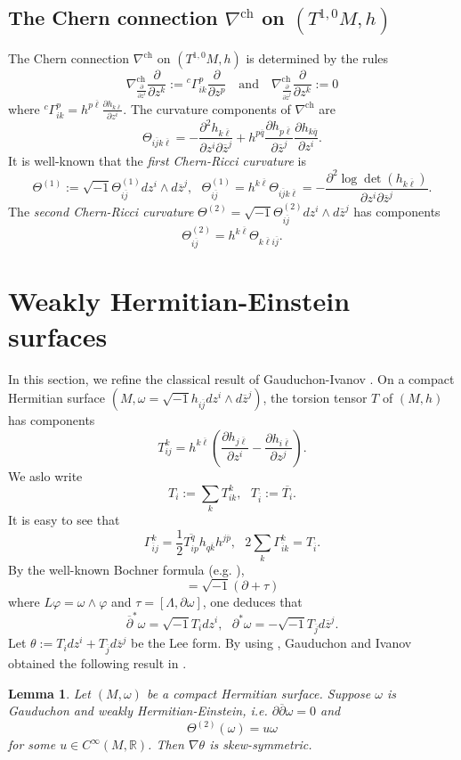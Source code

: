 \documentclass[12pt]{amsart}
\newcommand\bp{{\bar\partial}}
\theoremstyle{plain}
\newtheorem{lemma}[thm]{Lemma}
\theoremstyle{definition}
\newcommand{\elemma}{\end{lemma}}
\newcommand{\blemma}{\begin{lemma}}
\newcommand{\sq}{\sqrt{-1}}
\newcommand{\p}{\partial}
\renewcommand{\bar}{\overline}
\renewcommand{\phi}{\varphi}
\newcommand{\beq}{\begin{equation}}
\newcommand{\eeq}{\end{equation}}
\newcommand{\qtq}[1]{\quad\mbox{#1}\quad}
\renewcommand{\bp}{\bar{\partial}}
\renewcommand{\>}{\rightarrow}
\newcommand{\R}{{\mathbb R}}
\numberwithin{equation}{section} %
\begin{document}
	\baselineskip 	
	
	\subsection{The Chern connection $\nabla^{\mathrm{ch}}$ on $(T^{1,0}M,h)$} 
	\noindent 	The Chern
	connection $\nabla^{\mathrm{ch}}$ on $(T^{1,0}M,h)$ is  determined by the rules
	\beq
	\nabla^{\mathrm{ch}}_{\frac{\p}{\p z^i}}\frac{\p}{\p
		z^k}:={^c\Gamma}_{ik}^p\frac{\p}{\p z^p} \qtq{and}
	\nabla^{\mathrm{ch}}_{\frac{\p}{\p \bar z^j}}\frac{\p}{\p
		z^k}:=0 \eeq
	where ${^c\Gamma}_{ik}^p=h^{p\bar\ell}\frac{\p h_{k\bar\ell}}{\p z^i}$. 
	The curvature  components of $\nabla^{\mathrm{ch}}$ are \beq \Theta_{i\bar j k\bar
		\ell}=-\frac{\p^2 h_{k\bar \ell}}{\p z^i\p \bar z^j}+h^{p\bar
		q}\frac{\p h_{p\bar \ell}}{\p \bar z^j}\frac{\p h_{k\bar q}}{\p
		z^i}.\label{cherncurvatureformula} \eeq
	It is
	well-known that the \emph{first Chern-Ricci curvature} is \beq
	\Theta^{(1)}:= \sq\Theta^{(1)}_{i\bar j} dz^i\wedge d\bar z^j,\ \ \
	\Theta^{(1)}_{i\bar j}= h^{k\bar \ell}\Theta_{i\bar j k\bar \ell}
	=-\frac{\p^2 \log \det(h_{k\bar \ell})}{\p z^i\p\bar
		z^j}.\label{firstchernriccicurvatureformula}\eeq The \emph{second Chern-Ricci curvature}
	$\Theta^{(2)}=\sq \Theta^{(2)}_{i\bar j}dz^i\wedge d\bar z^j$ has
	components $$ \Theta^{(2)}_{i\bar j}=h^{k\bar \ell}\Theta_{k\bar
		\ell i\bar j}.$$
	
	
	\baselineskip 	
	
	
	
	\section{Weakly Hermitian-Einstein  surfaces}
	
	In this section, we refine the classical result of Gauduchon-Ivanov \cite{Gauduchon1997}.  On a compact Hermitian surface $\left(M,\omega=\sq
	h_{i\bar j}dz^i\wedge d\bar z^j\right)$, the torsion tensor $T$ of  $(M,h)$ has components
	\beq T_{ij}^k=h^{k\bar \ell}\left( \frac{\p h_{j\bar\ell}}{\p z^i}-\frac{\p h_{i\bar\ell}}{\p z^j}\right). \eeq
	We aslo write 
	\beq T_i:=\sum\limits_k T_{ik}^k,\ \ \ T_{\bar i}:=\bar {T_i}. \eeq 
	\noindent	
	It is easy to see that 
	\beq  \Gamma_{\bar i j}^k=\frac{1}{2}\bar{T_{ip}^q}h_{q\bar k}h^{j\bar p},\ \ \  2\sum_{k}\Gamma_{\bar i k}^k=T_{\bar i}.\eeq 	By the
well-known Bochner formula (e.g. \cite[Lemma~4.3]{LiuYang2012}), \beq [\bp^*,L]=\sq
\left(\p+\tau\right)\label{key0}\eeq  where $L \phi=\omega\wedge \phi$ and  $ \tau=[\Lambda,\p\omega]$,  one deduces that  \beq  \bp^*\omega=\sq T_{i}dz^i,\ \ \ \p^*\omega=-\sq T_{\bar j}d\bar z^j.\label{key1}
\eeq 
	Let $\theta:=T_idz^i+T_{\bar j}d\bar z^j$ be  the Lee form. By using \cite[Proposition ~2.2]{Tod1992},  Gauduchon and Ivanov obtained the following result in \cite[Theorem~1]{Gauduchon1997}.
\blemma  Let $(M,\omega)$ be a compact Hermitian surface. Suppose $\omega$ is Gauduchon and weakly Hermitian-Einstein, i.e.  $\p\bp\omega=0$ and
\beq \Theta^{(2)}(\omega)=u \omega \eeq 
for some $u\in C^\infty(M,\R)$. Then $\nabla\theta$ is skew-symmetric.
\elemma 
\end{document}
